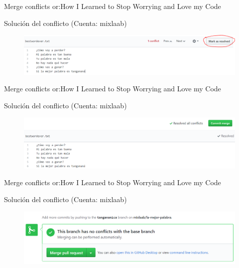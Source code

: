 \documentclass[10pt]{beamer}
\begin{document}
\begin{frame}{Merge conflicts or:}{How I Learned to Stop Worrying and Love my Code \heartsuit}

\begin{block}{Solución del conflicto (Cuenta: mixlaab)}

\begin{figure}[h!]
\centering
\includegraphics [scale=0.25]{conflict7}
\label{fig:issues}
\end{figure}
    
\end{block}

\end{frame}

\begin{frame}{Merge conflicts or:}{How I Learned to Stop Worrying and Love my Code \heartsuit}

\begin{block}{Solución del conflicto (Cuenta: mixlaab)}

\begin{figure}[h!]
\centering
\includegraphics [scale=0.25]{conflict8}
\label{fig:issues}
\end{figure}
    
\end{block}

\end{frame}

\begin{frame}{Merge conflicts or:}{How I Learned to Stop Worrying and Love my Code \heartsuit}

\begin{block}{Solución del conflicto (Cuenta: mixlaab)}

\begin{figure}[h!]
\centering
\includegraphics [scale=0.25]{merge}
\label{fig:issues}
\end{figure}
    
\end{block}

\end{frame}
\end{document}

